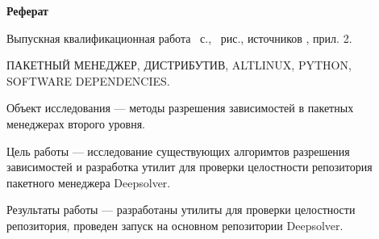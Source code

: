 \begin{center}
	\textbf{Реферат}
\end{center}

Выпускная квалификационная работа ~с., ~рис., источников , прил. 2.

ПАКЕТНЫЙ МЕНЕДЖЕР, ДИСТРИБУТИВ, ALTLINUX, PYTHON, SOFTWARE DEPENDENCIES.

Объект исследования --- методы разрешения зависимостей в пакетных менеджерах второго уровня.

Цель работы --- исследование существующих алгоримтов разрешения зависимостей и разработка
утилит для проверки целостности репозитория пакетного менеджера Deepsolver.

Результаты работы --- разработаны утилиты для проверки целостности репозитория, проведен запуск
на основном репозитории Deepsolver.

